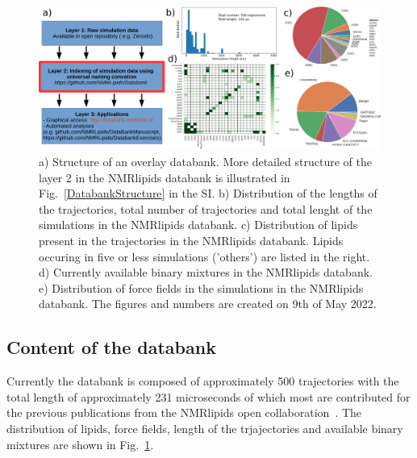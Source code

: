 \documentclass[fleqn,10pt]{wlscirep}
\begin{document}
\begin{figure}
    \centering
    \includegraphics[width = 180mm]{Figures/overlay.pdf}
    \caption{a) Structure of an overlay databank. 
    More detailed structure of the layer 2 in the NMRlipids databank is illustrated in Fig.~\ref{DatabankStructure} in the SI.
    b) Distribution of the lengths of the trajectories, total number of trajectories and total lenght of the simulations in the NMRlipids databank.
    c) Distribution of lipids present in the trajectories in the NMRlipids databank. Lipids occuring in five or less simulations ('others') are listed in the right. 
    d) Currently available binary mixtures in the NMRlipids databank. 
    e) Distribution of force fields in the simulations in the NMRlipids databank.
    The figures and numbers are created on 9th of May 2022.}
    \label{fig:overlay}
\end{figure}

\subsection{Content of the databank}
Currently the databank is composed of approximately 500 trajectories with the total length of approximately 231 microseconds of which most are contributed for the previous publications from the NMRlipids open collaboration~\cite{botan15,catte16,antila19,bacle21}. The distribution of lipids, force fields, length of the trjajectories and available binary mixtures are shown in Fig.~\ref{fig:overlay}. 
\end{document}

